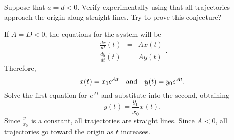 \documentclass{ximera}
\begin{document}
\begin{exercise} \label{c3.4.6}
Suppose that $a=d<0$.  Verify experimentally using {\pplane}
that all trajectories approach the origin along straight lines.
Try to prove this conjecture?

\begin{solution}

If $A = D < 0$, the equations for the system will be
\[ \begin{array}{rcl}
\frac{dx}{dt}(t) & = & Ax(t) \\
\frac{dy}{dt}(t) & = & Ay(t)\end{array}. \]
Therefore,
\[ x(t) = x_0e^{At} \quad\mbox{and}\quad y(t) = y_0e^{At}. \]
Solve the first equation for $e^{At}$ and substitute into the
second, obtaining \[ y(t) = \frac{y_0}{x_0}x(t). \]
Since $\frac{y_0}{x_0}$ is a constant, all trajectories are
straight lines.  Since $A < 0$, all trajectories go toward the
origin as $t$ increases.

\end{solution}
\end{exercise}
\end{document}
